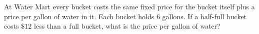 At Water Mart every bucket costs the same fixed price for the bucket itself plus a price per gallon of water in it. Each bucket holds $6$ gallons. If a half-full bucket costs $\$12$ less than a full bucket, what is the price per gallon of water?
